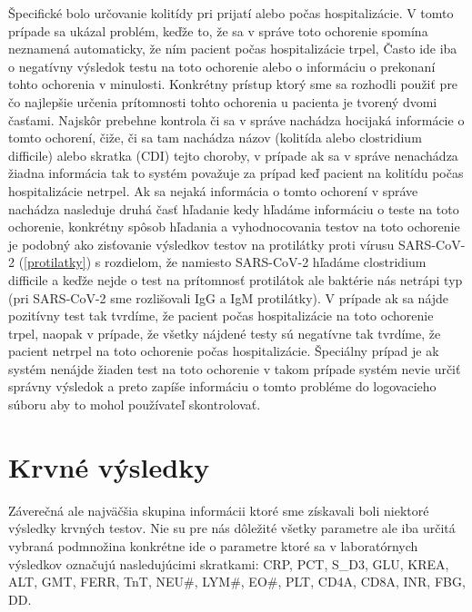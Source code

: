 Špecifické bolo určovanie kolitídy pri prijatí alebo počas hospitalizácie. V tomto prípade sa ukázal problém, keďže to, že sa v správe toto ochorenie spomína neznamená automaticky, že ním pacient počas hospitalizácie trpel, Často ide iba o negatívny výsledok testu na toto ochorenie alebo o informáciu o prekonaní tohto ochorenia v minulosti. Konkrétny prístup ktorý sme sa rozhodli použiť pre čo najlepšie určenia prítomnosti tohto ochorenia u pacienta je tvorený dvomi časťami. Najskôr prebehne kontrola či sa v správe nachádza hocijaká informácie o tomto ochorení, čiže, či sa tam nachádza názov (kolitída alebo clostridium difficile) alebo skratka (CDI) tejto choroby, v prípade ak sa v správe nenachádza žiadna informácia tak to systém považuje za prípad keď pacient na kolitídu počas hospitalizácie netrpel. Ak sa nejaká informácia o tomto ochorení v správe nachádza nasleduje druhá časť hľadanie kedy hľadáme informáciu o teste na toto ochorenie, konkrétny spôsob hľadania a vyhodnocovania testov na toto ochorenie je podobný ako zisťovanie výsledkov testov na protilátky proti vírusu SARS-CoV-2 (\ref{protilatky}) s rozdielom, že namiesto SARS-CoV-2 hľadáme clostridium difficile a keďže nejde o test na prítomnosť protilátok ale baktérie nás netrápi typ (pri SARS-CoV-2 sme rozlišovali IgG a IgM protilátky). V prípade ak sa nájde pozitívny test tak tvrdíme, že pacient počas hospitalizácie na toto ochorenie trpel, naopak v prípade, že všetky nájdené testy sú negatívne tak tvrdíme, že pacient netrpel na toto ochorenie počas hospitalizácie. Špeciálny prípad je ak systém nenájde žiaden test na toto ochorenie v takom prípade systém nevie určiť správny výsledok a preto zapíše informáciu o tomto probléme do logovacieho súboru aby to mohol používateľ skontrolovať.

\section{Krvné výsledky}

Záverečná ale najväčšia skupina informácii ktoré sme získavali boli niektoré výsledky krvných testov. Nie su pre nás dôležité všetky parametre ale iba určitá vybraná podmnožina konkrétne ide o parametre ktoré sa v laboratórnych výsledkov označujú nasledujúcimi skratkami: CRP, PCT, S\_D3, GLU, KREA, ALT, GMT, FERR, TnT, NEU\#, LYM\#, EO\#, PLT, CD4A, CD8A, INR, FBG, DD. 

